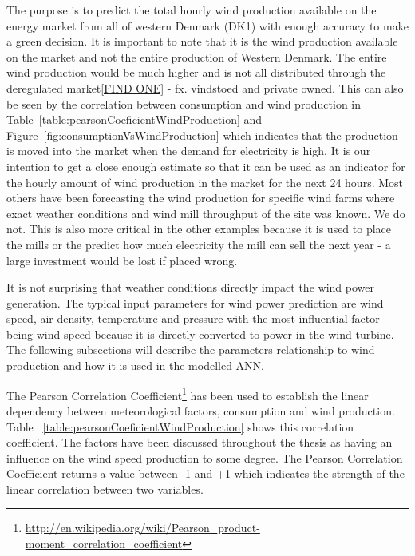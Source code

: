 The purpose is to predict the total hourly wind production available on the energy market from all of western Denmark (DK1) with enough accuracy to make a green decision. It is important to note that it is the wind production available on the market and not the entire production of Western Denmark. The entire wind production would be much higher and is not all distributed through the deregulated market\ref{FIND ONE} - fx. vindstoed and private owned. This can also be seen by the correlation between consumption and wind production in Table~\ref{table:pearsonCoeficientWindProduction} and Figure~\ref{fig:consumptionVsWindProduction} which indicates that the production is moved into the market when the demand for electricity is high. It is our intention to get a close enough estimate so that it can be used as an indicator for the hourly amount of wind production in the market for the next 24 hours.
Most others have been forecasting the wind production for specific wind farms where exact weather conditions and wind mill throughput of the site was known. We do not. This is also more critical in the other examples because it is used to place the mills or the predict how much electricity the mill can sell the next year - a large investment would be lost if placed wrong. 

It is not surprising that weather conditions directly impact the wind power generation. The typical input parameters for wind power prediction are wind speed, air density, temperature and pressure \cite{WindPowerGenerationUsingANN} with the most influential factor being wind speed because it is directly converted to power in the wind turbine. The following subsections will describe the parameters relationship to wind production and how it is used in the modelled ANN.

The Pearson Correlation Coefficient\footnote{\url{http://en.wikipedia.org/wiki/Pearson_product-moment_correlation_coefficient}} has been used to establish the linear dependency between meteorological factors, consumption and wind production. Table ~\ref{table:pearsonCoeficientWindProduction} shows this correlation coefficient. The factors have been discussed throughout the thesis as having an influence on the wind speed production to some degree. The Pearson Correlation Coefficient returns a value between -1 and +1 which indicates the strength of the linear correlation between two variables.

